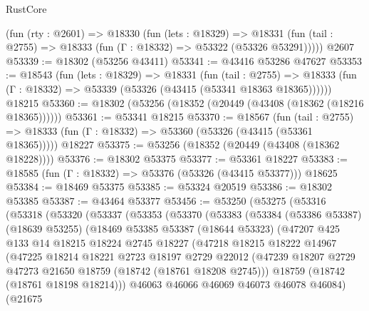 \begin{lexlean}{RustCore}
\begin{coremodule}
    (fun (rty : @2601) =>
    @18330
      (fun (lets : @18329) =>
      @18331 (fun (tail : @2755) => @18333 (fun (Γ : @18332) => @53322 (@53326 @53291)))))
    @2607
@53339 := @18302 (@53256 @43411)
@53341 := @43416 @53286 @47627
@53353 := @18543
    (fun (lets : @18329) =>
    @18331
      (fun (tail : @2755) =>
      @18333 (fun (Γ : @18332) => @53339 (@53326 (@43415 (@53341 @18363 @18365))))))
    @18215
@53360 := @18302 (@53256 (@18352 (@20449 (@43408 (@18362 (@18216 @18365))))))
@53361 := @53341 @18215
@53370 := @18567
    (fun (tail : @2755) => @18333 (fun (Γ : @18332) => @53360 (@53326 (@43415 (@53361 @18365)))))
    @18227
@53375 := @53256 (@18352 (@20449 (@43408 (@18362 @18228))))
@53376 := @18302 @53375
@53377 := @53361 @18227
@53383 := @18585 (fun (Γ : @18332) => @53376 (@53326 (@43415 @53377))) @18625
@53384 := @18469 @53375
@53385 := @53324 @20519
@53386 := @18302 @53385
@53387 := @43464 @53377
@53456 := @53250
    (@53275
      (@53316
        (@53318
          (@53320
            (@53337
              (@53353
                (@53370
                  (@53383
                    (@53384
                      (@53386 @53387)
                      (@18639 @53255)
                      (@18469
                        @53385
                        @53387
                        (@18644 @53323)
                        (@47207
                          @425
                          @133
                          @14
                          @18215
                          @18224
                          @2745
                          @18227
                          (@47218
                            @18215
                            @18222
                            @14967
                            (@47225
                              @18214
                              @18221
                              @2723
                              @18197
                              @2729
                              @22012
                              (@47239
                                @18207
                                @2729
                                @47273
                                @21650
                                @18759
                                (@18742 (@18761 @18208 @2745)))
                              @18759
                              (@18742 (@18761 @18198 @18214)))
                            @46063
                            @46066
                            @46069
                            @46073
                            @46078
                            @46084)
                          (@21675

\end{coremodule}
\end{lexlean}
